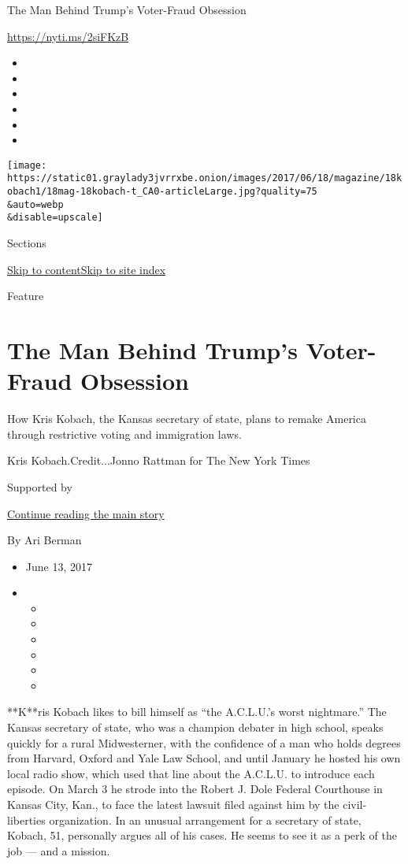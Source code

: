 The Man Behind Trump's Voter-Fraud Obsession

\href{https://nyti.ms/2siFKzB}{https://nyti.ms/2siFKzB}

\begin{itemize}
\item
\item
\item
\item
\item
\item
\end{itemize}

\texttt{[image: https://static01.graylady3jvrrxbe.onion/images/2017/06/18/magazine/18kobach1/18mag-18kobach-t\_CA0-articleLarge.jpg?quality=75\\\&auto=webp\\\&disable=upscale]}

Sections

\protect\hyperlink{site-content}{Skip to
content}\protect\hyperlink{site-index}{Skip to site index}

Feature

\hypertarget{the-man-behind-trumps-voter-fraud-obsession}{%
\section{The Man Behind Trump's Voter-Fraud
Obsession}\label{the-man-behind-trumps-voter-fraud-obsession}}

How Kris Kobach, the Kansas secretary of state, plans to remake America
through restrictive voting and immigration laws.

Kris Kobach.Credit...Jonno Rattman for The New York Times

Supported by

\protect\hyperlink{after-sponsor}{Continue reading the main story}

By Ari Berman

\begin{itemize}
\item
  June 13, 2017
\item
  \begin{itemize}
  \item
  \item
  \item
  \item
  \item
  \item
  \end{itemize}
\end{itemize}

**K**ris Kobach likes to bill himself as ``the A.C.L.U.'s worst
nightmare.'' The Kansas secretary of state, who was a champion debater
in high school, speaks quickly for a rural Midwesterner, with the
confidence of a man who holds degrees from Harvard, Oxford and Yale Law
School, and until January he hosted his own local radio show, which used
that line about the A.C.L.U. to introduce each episode. On March 3 he
strode into the Robert J. Dole Federal Courthouse in Kansas City, Kan.,
to face the latest lawsuit filed against him by the civil-liberties
organization. In an unusual arrangement for a secretary of state,
Kobach, 51, personally argues all of his cases. He seems to see it as a
perk of the job --- and a mission.


